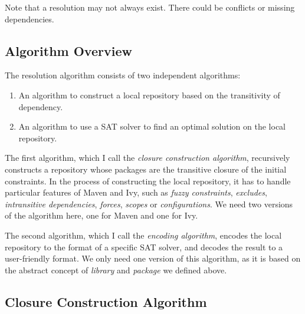 Note that a resolution may not always exist. There could be conflicts or missing dependencies.

\subsection{Algorithm Overview}

The resolution algorithm consists of two independent algorithms:

\begin{enumerate}
\item An algorithm to construct a local repository based on the transitivity of dependency.
\item An algorithm to use a SAT solver to find an optimal solution on the local repository.
\end{enumerate}

The first algorithm, which I call the \emph{closure construction algorithm}, recursively constructs a repository whose packages are the transitive closure of the initial constraints. In the process of constructing the local repository, it has to handle particular features of Maven and Ivy, such as \emph{fuzzy constraints}, \emph{excludes}, \emph{intransitive dependencies}, \emph{forces}, \emph{scopes} or \emph{configurations}. We need two versions of the algorithm here, one for Maven and one for Ivy.

The second algorithm, which I call the \emph{encoding algorithm}, encodes the local repository to the format of a specific SAT solver, and decodes the result to a user-friendly format. We only need one version of this algorithm, as it is based on the abstract concept of \emph{library} and \emph{package} we defined above.



\subsection{Closure Construction Algorithm}

